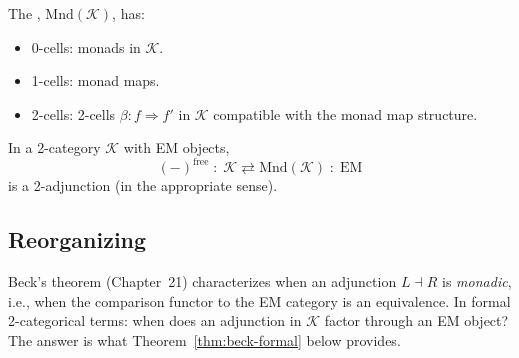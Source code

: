 \begin{definition}
\label{def:mnd-K}
The , $\mathrm{Mnd}(\mathcal{K})$,
has:
\begin{itemize}
  \item 0-cells: monads in $\mathcal{K}$.
  \item 1-cells: monad maps.
  \item 2-cells: 2-cells $\beta : f \Rightarrow f'$ in $\mathcal{K}$
        compatible with the monad map structure.
\end{itemize}
\end{definition}

\begin{theorem}
\label{thm:mnd-adjoints}
In a 2-category $\mathcal{K}$ with EM objects,
\begin{equation*}
  (-)^{\mathrm{free}} \;:\; \mathcal{K} \rightleftarrows \mathrm{Mnd}(\mathcal{K})
  \;:\; \mathrm{EM}
\end{equation*}
is a 2-adjunction (in the appropriate sense).
\end{theorem}

\begin{prooflog}
\end{prooflog}

\subsection{Reorganizing}

\begin{remark}
Beck's theorem (Chapter~21) characterizes when an adjunction $L \dashv R$ is
\emph{monadic}, i.e., when the comparison functor to the EM category is an
equivalence. In formal 2-categorical terms: when does an adjunction in
$\mathcal{K}$ factor through an EM object? The answer is what
Theorem~\ref{thm:beck-formal} below provides.
\end{remark}

